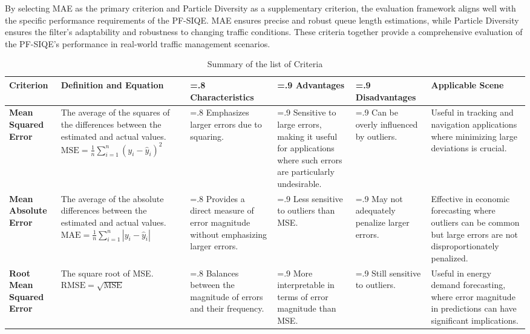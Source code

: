 By selecting MAE as the primary criterion and Particle Diversity as a supplementary criterion, the evaluation framework aligns well with the specific performance requirements of the PF-SIQE. MAE ensures precise and robust queue length estimations, while Particle Diversity ensures the filter's adaptability and robustness to changing traffic conditions. These criteria together provide a comprehensive evaluation of the PF-SIQE's performance in real-world traffic management scenarios.
\begin{landscape}
\begin{table}
\centering
\footnotesize 
\caption{Summary of the list of Criteria}
\label{Summary of the list of Criteria}
\begin{tabularx}{\linewidth}{@{} l 
>{\hsize=1.2\hsize}X  
>{\hsize=.8\hsize}X  
>{\hsize=.9\hsize}X  
>{\hsize=.9\hsize}X 
>{\hsize=1.2\hsize}X 
@{}} 
\toprule
\textbf{Criterion} & \textbf{Definition and Equation} & \textbf{Characteristics} & \textbf{Advantages} & \textbf{Disadvantages} & \textbf{Applicable Scene} \\ 
\midrule
\textbf{Mean Squared Error} & The average of the squares of the differences between the estimated and actual values. \newline
\( \text{MSE} = \frac{1}{n} \sum_{i=1}^{n} (y_i - \hat{y}_i)^2 \) & Emphasizes larger errors due to squaring. & Sensitive to large errors, making it useful for applications where such errors are particularly undesirable. & Can be overly influenced by outliers. & Useful in tracking and navigation applications where minimizing large deviations is crucial. \\ 
\midrule
\textbf{Mean Absolute Error} & The average of the absolute differences between the estimated and actual values. \newline
\( \text{MAE} = \frac{1}{n} \sum_{i=1}^{n} |y_i - \hat{y}_i| \) & Provides a direct measure of error magnitude without emphasizing larger errors. & Less sensitive to outliers than MSE. & May not adequately penalize larger errors. & Effective in economic forecasting where outliers can be common but large errors are not disproportionately penalized. \\ 
\midrule
\textbf{Root Mean Squared Error} & The square root of MSE. \newline
\( \text{RMSE} = \sqrt{\text{MSE}} \) & Balances between the magnitude of errors and their frequency. & More interpretable in terms of error magnitude than MSE. & Still sensitive to outliers. & Useful in energy demand forecasting, where error magnitude in predictions can have significant implications. \\ 

\end{tabularx}
\end{table}
\end{landscape}
